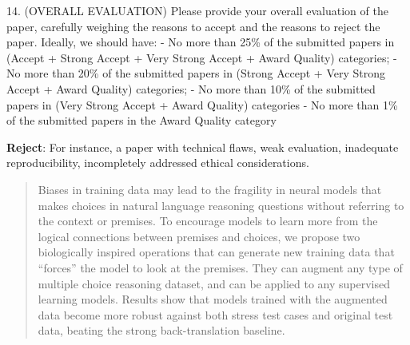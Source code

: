 \documentclass{article}
\begin{document}
14. (OVERALL EVALUATION) Please provide your overall evaluation of the paper, carefully 
weighing the reasons to accept and the reasons to reject the paper. 
Ideally, we should have: - No more than 25\% of the submitted papers 
in (Accept + Strong Accept + Very Strong Accept + Award Quality) categories; - 
No more than 20\% of the submitted papers in (Strong Accept + Very Strong Accept 
+ Award Quality) categories; - No more than 10\% of the submitted papers 
in (Very Strong Accept + Award Quality) categories - No more than 1\% 
of the submitted papers in the Award Quality category

\textbf{Reject}: For instance, a paper with technical flaws, 
weak evaluation, inadequate reproducibility, 
incompletely addressed ethical considerations.

\begin{abstract}
Biases in training data may lead to the fragility in neural models
that makes choices in natural language reasoning questions without
referring to the context or premises. 
To encourage models to learn more from the logical connections between 
premises and choices, we propose two biologically inspired operations 
that can generate new training data that ``forces'' the model
to look at the premises. They can augment
any type of multiple choice reasoning dataset, and can be applied to
any supervised learning models. Results show that models trained
with the augmented data become more robust against both stress test cases and original
test data, beating the strong back-translation baseline.

\end{abstract}









\end{document}
